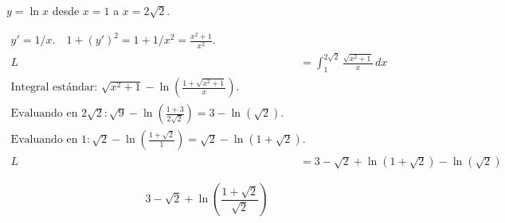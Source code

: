 $y=\ln x$ desde $x=1$ a $x=2\sqrt{2}$.

\nopagebreak
\begin{align*}
y' = 1/x. \quad 1+(y')^2 = 1 + 1/x^2 = \frac{x^2+1}{x^2}. \\
L &= \int_{1}^{2\sqrt{2}} \frac{\sqrt{x^2+1}}{x} \, dx \\
\text{Integral estándar: } \sqrt{x^2+1} - \ln\left(\frac{1+\sqrt{x^2+1}}{x}\right). \\
\text{Evaluando en } 2\sqrt{2}: \sqrt{9} - \ln(\frac{1+3}{2\sqrt{2}}) = 3 - \ln(\sqrt{2}). \\
\text{Evaluando en } 1: \sqrt{2} - \ln(\frac{1+\sqrt{2}}{1}) = \sqrt{2} - \ln(1+\sqrt{2}). \\
L &= 3 - \sqrt{2} + \ln(1+\sqrt{2}) - \ln(\sqrt{2})
\end{align*}

\[
\boxed{\displaystyle 3 - \sqrt{2} + \ln\left(\frac{1+\sqrt{2}}{\sqrt{2}}\right)}
\]
